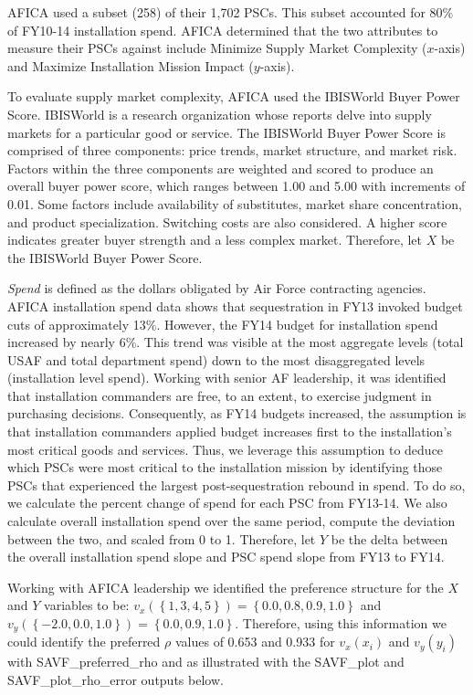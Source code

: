 \documentclass[twocolumn]{svjour3}       %
\begin{document}
AFICA used a subset (258) of their 1,702 PSCs.  This subset accounted for 80\% of FY10-14 installation spend.  AFICA determined that the two attributes to measure their PSCs against include Minimize Supply Market Complexity ($x$-axis) and Maximize Installation Mission Impact ($y$-axis).

To evaluate supply market complexity, AFICA used the IBISWorld Buyer Power Score. IBISWorld is a research organization whose reports delve into supply markets for a particular good or service. The IBISWorld Buyer Power Score is comprised of three components: price trends, market structure, and market risk. Factors within the three components are weighted and scored to produce an overall buyer power score, which ranges between 1.00 and 5.00 with increments of 0.01. Some factors include availability of substitutes, market share concentration, and product specialization. Switching costs are also considered. A higher score indicates greater buyer strength and a less complex market. Therefore, let $X$ be the IBISWorld Buyer Power Score.

\textit{Spend} is defined as the dollars obligated by Air Force contracting agencies. AFICA installation spend data shows that sequestration in FY13 invoked budget cuts of approximately 13\%. However, the FY14 budget for installation spend increased by nearly 6\%. This trend was visible at the most aggregate levels (total USAF and total department spend) down to the most disaggregated levels (installation level spend). Working with senior AF leadership, it was identified that installation commanders are free, to an extent, to exercise judgment in purchasing decisions. Consequently, as FY14 budgets increased, the assumption is that installation commanders applied budget increases first to the installation's most critical goods and services. Thus, we leverage this assumption to deduce which PSCs were most critical to the installation mission by identifying those PSCs that experienced the largest post-sequestration rebound in spend. To do so, we calculate the percent change of spend for each PSC from FY13-14. We also calculate overall installation spend over the same period, compute the deviation between the two, and scaled from 0 to 1.  Therefore, let $Y$ be the delta between the overall installation spend slope and PSC spend slope from FY13 to FY14.

Working with AFICA leadership we identified the preference structure for the $X$ and $Y$ variables to be: $v_x\left(\left\{1, 3, 4, 5\right\}\right) = \left\{0.0, 0.8, 0.9, 1.0\right\}$ and $v_y\left(\left\{-2.0, 0.0, 1.0\right\}\right) = \left\{0.0, 0.9, 1.0\right\}$. Therefore, using this information we could identify the preferred $\rho$ values of 0.653 and 0.933 for $v_x\left(x_i\right)$ and $v_y\left(y_i\right)$ with SAVF\_preferred\_rho and as illustrated with the SAVF\_plot and SAVF\_plot\_rho\_error outputs below.
\end{document}
